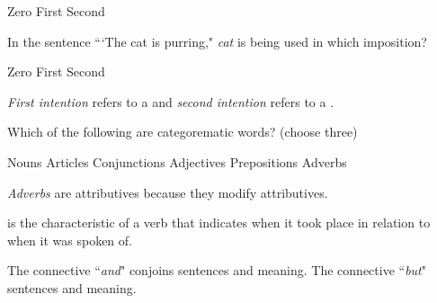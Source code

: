 \documentclass[answers]{exam}
\begin{document}
\begin{questions}
      \begin{oneparchoices}
        \choice Zero
        \choice First
        \CorrectChoice Second
      \end{oneparchoices}
      
      \question In the sentence ```The cat is purring," \textit{cat} is being used in which imposition?

      \begin{oneparchoices}
        \choice Zero
        \CorrectChoice First
        \choice Second
      \end{oneparchoices}
      
      \question \textit{First intention} refers to a \fillin[reality] and \textit{second intention} refers to a \fillin[concept].

	\question Which of the following are categorematic words? (choose three)
	
	\begin{oneparcheckboxes}
	\CorrectChoice Nouns
	\choice Articles
	\choice Conjunctions
	\CorrectChoice Adjectives
	\choice Prepositions
	\CorrectChoice Adverbs
	\end{oneparcheckboxes}

	\question \textit{Adverbs} are \fillin[secondary] attributives because they modify \fillin[primary] attributives.
	
	\question \fillin[Tense] is the characteristic of a verb that indicates when it took place in relation to when it was spoken of.
	
	\question The connective ``\textit{and}" conjoins sentences and meaning. The connective ``\textit{but}" \fillin[disjoins] sentences and meaning.

\end{questions}
\end{document}
